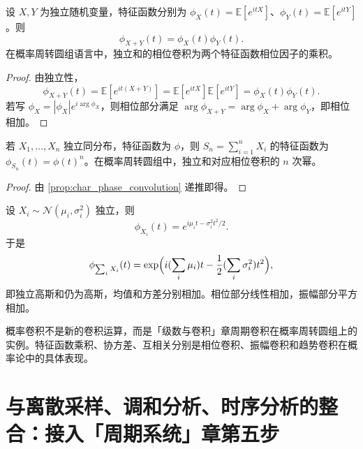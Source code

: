 \begin{proposition}[特征函数与相位卷积]\label{prop:char_phase_convolution}
设 $X,Y$ 为独立随机变量，特征函数分别为 $\phi_X(t)=\mathbb E[e^{itX}]$、$\phi_Y(t)=\mathbb E[e^{itY}]$。则
\[
\phi_{X+Y}(t)=\phi_X(t)\phi_Y(t).
\]
在概率周转圆组语言中，独立和的相位卷积为两个特征函数相位因子的乘积。
\end{proposition}

\begin{proof}
由独立性，
\[
\phi_{X+Y}(t)=\mathbb E[e^{it(X+Y)}]=\mathbb E[e^{itX}]\mathbb E[e^{itY}]=\phi_X(t)\phi_Y(t).
\]
若写 $\phi_X=|\phi_X|e^{i\arg\phi_X}$，则相位部分满足 $\arg\phi_{X+Y}=\arg\phi_X+\arg\phi_Y$，即相位相加。
\end{proof}

\begin{corollary}[独立和与卷积]\label{cor:indep_sum_conv}
若 $X_1,\dots,X_n$ 独立同分布，特征函数为 $\phi$，则 $S_n=\sum_{i=1}^nX_i$ 的特征函数为 $\phi_{S_n}(t)=\phi(t)^n$。在概率周转圆组中，独立和对应相位卷积的 $n$ 次幂。
\end{corollary}

\begin{proof}
由 \cref{prop:char_phase_convolution} 递推即得。
\end{proof}

\begin{example}[高斯和的相位卷积]\label{ex:gaussian_sum}
设 $X_i\sim\mathcal N(\mu_i,\sigma_i^2)$ 独立，则
\[
\phi_{X_i}(t)=e^{i\mu_it-\sigma_i^2t^2/2}.
\]
于是
\[
\phi_{\sum_iX_i}(t)=\exp\Bigl(i(\sum_i\mu_i)t-\frac12(\sum_i\sigma_i^2)t^2\Bigr),
\]
即独立高斯和仍为高斯，均值和方差分别相加。相位部分线性相加，振幅部分平方相加。
\end{example}

\begin{remark}[概率卷积与周期卷积的关系]\label{rem:prob_convolution_relation}
概率卷积不是新的卷积运算，而是「级数与卷积」章周期卷积在概率周转圆组上的实例。特征函数乘积、协方差、互相关分别是相位卷积、振幅卷积和趋势卷积在概率论中的具体表现。
\end{remark}

\section{与离散采样、调和分析、时序分析的整合：接入「周期系统」章第五步}
\label{sec:prob_integration}

